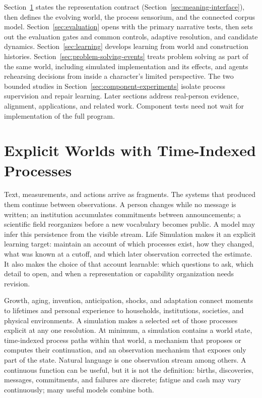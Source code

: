 \documentclass[10pt]{article}
\begin{document}
Section~\ref{sec:temporal-object} states the representation contract
(Section~\ref{sec:meaning-interface}), then defines the evolving world, the
process sensorium, and the connected corpus model. Section~\ref{sec:evaluation}
opens with the primary narrative tests, then sets out the evaluation gates and
common controls, adaptive resolution, and candidate dynamics. Section~\ref{sec:learning} develops learning from world and construction
histories. Section~\ref{sec:problem-solving-events} treats problem solving as
part of the same world, including simulated implementation and its effects,
and agents rehearsing decisions from inside a character's limited perspective.
The two bounded studies in Section~\ref{sec:component-experiments} isolate
process supervision and repair learning. Later sections address real-person
evidence, alignment, applications, and related work. Component tests need
not wait for implementation of the full program.

\section{Explicit Worlds with Time-Indexed Processes}
\label{sec:temporal-object}

Text, measurements, and actions arrive as fragments. The systems that produced
them continue between observations. A person changes while no message is
written; an institution accumulates commitments between announcements; a
scientific field reorganizes before a new vocabulary becomes public. A model
may infer this persistence from the visible stream. Life Simulation makes it
an explicit learning target: maintain an account of which processes exist,
how they changed, what was known at a cutoff, and which later observation
corrected the estimate. It also makes the choice of that account learnable:
which questions to ask, which detail to open, and when a representation or
capability organization needs revision.

Growth, aging, invention,
anticipation, shocks, and adaptation connect moments to lifetimes and personal
experience to households, institutions, societies, and physical environments.
A simulation makes a selected set of those processes explicit at any one
resolution. At minimum,
a simulation contains a world state, time-indexed process paths within that
world, a mechanism that proposes or computes their continuation, and an
observation mechanism that exposes only part of the state. Natural language is
one observation stream among others. A continuous function can be useful, but
it is not the definition: births, discoveries, messages, commitments, and
failures are discrete; fatigue and cash may vary continuously; many useful
models combine both.
\end{document}
